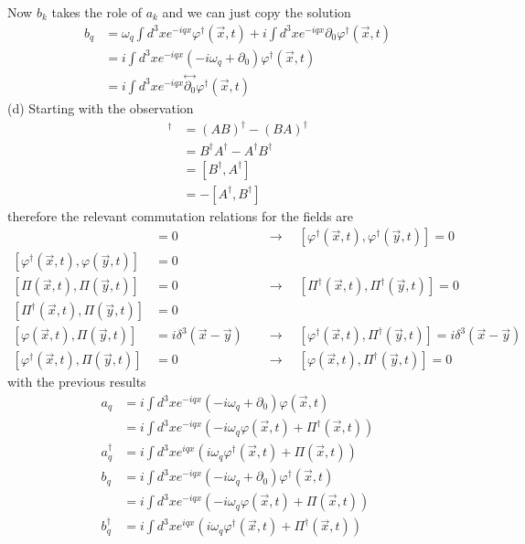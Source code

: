 \documentclass[10pt,a4paper]{book}
\theoremstyle{definition}
\begin{document}
Now $b_k$ takes the role of $a_k$ and we can just copy the solution
\begin{align}
b_q&=\omega_q\int d^3x e^{-iqx}\varphi^\dagger(\vec{x},t)+i\int d^3x e^{-iqx}\partial_0\varphi^\dagger(\vec{x},t)\\
&=i\int d^3x e^{-iqx}(-i\omega_q+\partial_0)\varphi^\dagger(\vec{x},t)\\
&=i\int d^3x e^{-iqx}\stackrel{\leftrightarrow}{\partial_0}\varphi^\dagger(\vec{x},t)
\end{align}
(d) Starting with the observation
\begin{align}
[A,B]^\dagger
&=(AB)^\dagger-(BA)^\dagger\\
&=B^\dagger A^\dagger- A^\dagger B^\dagger\\
&=[B^\dagger,A^\dagger]\\
&=-[A^\dagger,B^\dagger]
\end{align}
therefore the relevant commutation relations for the fields are
\begin{align}
[\varphi(\vec{x},t),\varphi(\vec{y},t)]&=0\quad&\rightarrow\quad[\varphi^\dagger(\vec{x},t),\varphi^\dagger(\vec{y},t)]=0\\
%
[\varphi^\dagger(\vec{x},t),\varphi(\vec{y},t)]&=0&\\
%
[\Pi(\vec{x},t),\Pi(\vec{y},t)]&=0\quad&\rightarrow\quad[\Pi^\dagger(\vec{x},t),\Pi^\dagger(\vec{y},t)]=0\\
%
[\Pi^\dagger(\vec{x},t),\Pi(\vec{y},t)]&=0&\\
%
[\varphi(\vec{x},t),\Pi(\vec{y},t)]&=i\delta^3(\vec{x}-\vec{y})\quad&\rightarrow\quad[\varphi^\dagger(\vec{x},t),\Pi^\dagger(\vec{y},t)]=i\delta^3(\vec{x}-\vec{y})\\
%
[\varphi^\dagger(\vec{x},t),\Pi(\vec{y},t)]&=0\quad&\rightarrow\quad[\varphi(\vec{x},t),\Pi^\dagger(\vec{y},t)]=0
\end{align}
with the previous results
\begin{align}
a_q&=i\int d^3x e^{-iqx}(-i\omega_q+\partial_0)\varphi(\vec{x},t)\\
&=i\int d^3x e^{-iqx}(-i\omega_q\varphi(\vec{x},t)+\Pi^\dagger(\vec{x},t))\\
a^\dagger_q&=i\int d^3x e^{iqx}(i\omega_q\varphi^\dagger(\vec{x},t)+\Pi(\vec{x},t))\\
b_q&=i\int d^3x e^{-iqx}(-i\omega_q+\partial_0)\varphi^\dagger(\vec{x},t)\\
&=i\int d^3x e^{-iqx}(-i\omega_q\varphi(\vec{x},t)+\Pi(\vec{x},t))\\
b^\dagger_q&=i\int d^3x e^{iqx}(i\omega_q\varphi^\dagger(\vec{x},t)+\Pi^\dagger(\vec{x},t))
\end{align}
\end{document}
